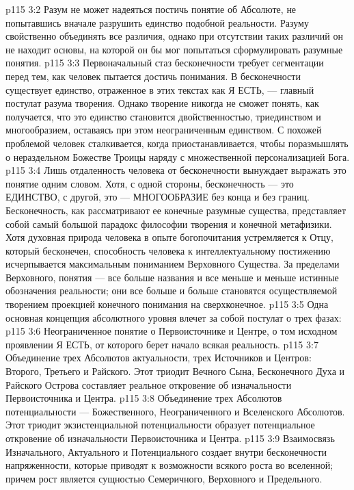 \vs p115 3:2 Разум не может надеяться постичь понятие об Абсолюте, не попытавшись вначале разрушить единство подобной реальности. Разуму свойственно объединять все различия, однако при отсутствии таких различий он не находит основы, на которой он бы мог попытаться сформулировать разумные понятия.
\vs p115 3:3 Первоначальный стаз бесконечности требует сегментации перед тем, как человек пытается достичь понимания. В бесконечности существует единство, отраженное в этих текстах как Я ЕСТЬ, --- главный постулат разума творения. Однако творение никогда не сможет понять, как получается, что это единство становится двойственностью, триединством и многообразием, оставаясь при этом неограниченным единством. С похожей проблемой человек сталкивается, когда приостанавливается, чтобы поразмышлять о нераздельном Божестве Троицы наряду с множественной персонализацией Бога.
\vs p115 3:4 Лишь отдаленность человека от бесконечности вынуждает выражать это понятие одним словом. Хотя, с одной стороны, бесконечность --- это ЕДИНСТВО, с другой, это --- МНОГООБРАЗИЕ без конца и без границ. Бесконечность, как рассматривают ее конечные разумные существа, представляет собой самый большой парадокс философии творения и конечной метафизики. Хотя духовная природа человека в опыте богопочитания устремляется к Отцу, который бесконечен, способность человека к интеллектуальному постижению исчерпывается максимальным пониманием Верховного Существа. За пределами Верховного, понятия --- все больше названия и все меньше и меньше истинные обозначения реальности; они все больше и больше становятся осуществляемой творением проекцией конечного понимания на сверхконечное.
\vs p115 3:5 \pc Одна основная концепция абсолютного уровня влечет за собой постулат о трех фазах:
\vs p115 3:6 \bibnobreakspace {} Неограниченное понятие о Первоисточнике и Центре, о том исходном проявлении Я ЕСТЬ, от которого берет начало всякая реальность.
\vs p115 3:7 \pc {}\bibnobreakspace {} Объединение трех Абсолютов актуальности, трех Источников и Центров: Второго, Третьего и Райского. Этот триодит Вечного Сына, Бесконечного Духа и Райского Острова составляет реальное откровение об изначальности Первоисточника и Центра.
\vs p115 3:8 \pc {}\bibnobreakspace {} Объединение трех Абсолютов потенциальности --- Божественного, Неограниченного и Вселенского Абсолютов. Этот триодит экзистенциальной потенциальности образует потенциальное откровение об изначальности Первоисточника и Центра.
\vs p115 3:9 \pc Взаимосвязь Изначального, Актуального и Потенциального создает внутри бесконечности напряженности, которые приводят к возможности всякого роста во вселенной; причем рост является сущностью Семеричного, Верховного и Предельного.
